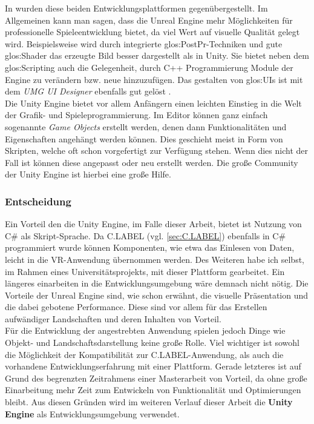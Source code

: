 In \cite{bib:UEvsUE4} wurden diese beiden Entwicklungsplattformen gegenübergestellt. Im Allgemeinen kann man sagen, dass die Unreal Engine mehr Möglichkeiten für professionelle Spieleentwicklung bietet, da viel Wert auf visuelle Qualität gelegt wird. Beispielsweise wird durch integrierte \gls{glos:PostPr}-Techniken und gute \gls{glos:Shader} das erzeugte Bild besser dargestellt als in Unity. Sie bietet neben dem \gls{glos:Scripting} auch die Gelegenheit, durch C++ Programmierung Module der Engine zu verändern bzw. neue hinzuzufügen. Das gestalten von \glspl{glos:UI} ist mit dem \textit{UMG UI Designer} ebenfalls gut gelöst .\\

Die Unity Engine bietet vor allem Anfängern einen leichten Einstieg in die Welt der Grafik- und Spieleprogrammierung. Im Editor können ganz einfach sogenannte \textit{Game Objects} erstellt werden, denen dann Funktionalitäten und Eigenschaften angehängt werden können. Dies geschieht meist in Form von Skripten, welche oft schon vorgefertigt zur Verfügung stehen. Wenn dies nicht der Fall ist können diese angepasst oder neu erstellt werden. Die große Community der Unity Engine ist hierbei eine große Hilfe.

\subsubsection{Entscheidung}
\label{sec:UnityDecision}
Ein Vorteil den die Unity Engine, im Falle dieser Arbeit, bietet ist Nutzung von C\# als Skript-Sprache. Da  
C.LABEL (vgl. \ref{sec:C.LABEL}) ebenfalls in C\# programmiert wurde können Komponenten, wie etwa das Einlesen von Daten, leicht in die VR-Anwendung übernommen werden. Des Weiteren habe ich selbst, im Rahmen eines Universitätsprojekts, mit dieser Plattform gearbeitet. Ein längeres einarbeiten in die Entwicklungsumgebung wäre demnach nicht nötig. Die Vorteile der Unreal Engine sind, wie schon erwähnt, die visuelle Präsentation und die dabei gebotene Performance. Diese sind vor allem für das Erstellen aufwändiger Landschaften und deren Inhalten von Vorteil. \\

Für die Entwicklung der angestrebten Anwendung spielen jedoch Dinge wie Objekt- und Landschaftsdarstellung keine große Rolle. Viel wichtiger ist sowohl die Möglichkeit der Kompatibilität zur C.LABEL-Anwendung, als auch die vorhandene Entwicklungserfahrung mit einer Plattform. Gerade letzteres ist auf Grund des begrenzten Zeitrahmens einer Masterarbeit von Vorteil, da ohne große Einarbeitung mehr Zeit zum Entwickeln von Funktionalität und Optimierungen bleibt. Aus diesen Gründen wird im weiteren Verlauf dieser Arbeit die \textbf{Unity Engine} als Entwicklungsumgebung verwendet.

